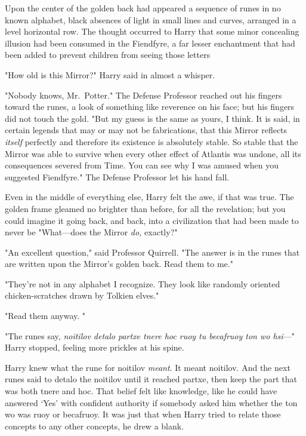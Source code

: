 Upon the center of the golden back had appeared a sequence of runes in no known
alphabet, black absences of light in small lines and curves, arranged in a
level horizontal row. The thought occurred to Harry that some minor concealing
illusion had been consumed in the Fiendfyre, a far lesser enchantment that had
been added to prevent children from seeing those letters{\el}

"How old is this Mirror?" Harry said in almost a whisper.

"Nobody knows, Mr.~Potter." The Defense Professor reached out his fingers
toward the runes, a look of something like reverence on his face; but his
fingers did not touch the gold. "But my guess is the same as yours, I think. It
is said, in certain legends that may or may not be fabrications, that this
Mirror reflects \emph{itself} perfectly and therefore its existence is
absolutely stable. So stable that the Mirror was able to survive when every
other effect of Atlantis was undone, all its consequences severed from Time.
You can see why I was amused when you suggested Fiendfyre." The Defense
Professor let his hand fall.

Even in the middle of everything else, Harry felt the awe, if that was true.
The golden frame gleamed no brighter than before, for all the revelation; but
you could imagine it going back, and back, into a civilization that had been
made to never be{\el} "What—does the Mirror \emph{do,} exactly?"

"An excellent question," said Professor Quirrell. "The answer is in the runes
that are written upon the Mirror's golden back. Read them to me."

"They're not in any alphabet I recognize. They look like randomly oriented
chicken-scratches drawn by Tolkien elves."

"Read them anyway. "

"The runes say, \emph{noitilov detalo partxe tnere hoc ruoy tu becafruoy ton wo
hsi}—" Harry stopped, feeling more prickles at his spine.

Harry knew what the rune for noitilov \emph{meant}. It meant noitilov. And the
next runes said to detalo the noitilov until it reached partxe, then keep the
part that was both tnere and hoc. That belief felt like knowledge, like he could
have answered `Yes' with confident authority if somebody asked him
whether the ton wo was ruoy or becafruoy. It was just that when Harry tried to
relate those concepts to any other concepts, he drew a blank.

